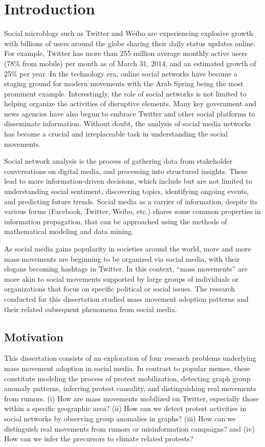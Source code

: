 \chapter{Introduction}
Social microblogs such as Twitter and Weibo are experiencing explosive growth with billions of users around the globe sharing their daily status updates online. For example, Twitter has more than 255 million average monthly active users (78\% from mobile) per month as of March 31, 2014, and an estimated growth of 25\% per year. In the technology era, online social networks have become a staging ground for modern movements with the Arab Spring being the most prominent example. Interestingly, the role of social networks is not limited to helping organize the activities of disruptive elements. Many key government and news agencies have also begun to embrace Twitter and other social platforms to disseminate information. Without doubt, the analysis of social media networks has become a crucial and irreplaceable task in understanding the social movements.

Social network analysis is the process of gathering data from stakeholder conversations on digital media, and processing into structured insights. These lead to more information-driven decisions, which include but are not limited to understanding social sentiment, discovering topics, identifying ongoing events, and predicting future trends. Social media as a carrier of information, despite its various forms (Facebook, Twitter, Weibo, etc.)
shares some common properties in information propagation, that can be approached
using the methods of mathematical modeling and data mining.

As social media gains popularity in societies around the world, more and more mass movements are beginning to be organized via social media, with their slogans becoming hashtags in Twitter. In this context, ``mass movements'' are more akin to social movements supported by large groups of individuals or organizations that focus on specific political or social issues. The research conducted for this dissertation studied mass movement adoption patterns and their related subsequent phenomena from social media.


\section{Motivation}
This dissertation consists of an exploration of four research problems underlying mass movement adoption in social media. In contrast to popular memes, these constitute modeling the process of protest mobilization, detecting graph group anomaly patterns, inferring protest causality, and distinguishing real movements from rumors. (i) How are mass movements mobilized on Twitter, especially those within a specific geographic area? (ii) How can we detect protest activities in social networks by observing group anomalies in graphs? (iii) How can we distinguish real movements from rumors or misinformation campaigns? and (iv) How can we infer the precursors to climate related protests?


